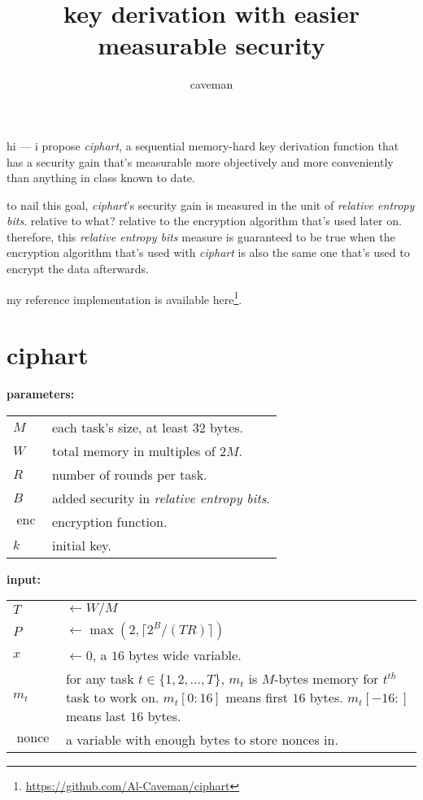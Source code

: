 \documentclass{article}
\author{caveman}
\title{key derivation with easier measurable security}
\DeclareMathOperator{\enc}{enc}
\DeclareMathOperator{\maxf}{max}
\DeclareMathOperator{\nonce}{nonce}
\begin{document}
\begin{multicols}{2}
\maketitle

hi --- i propose \emph{ciphart}, a sequential memory-hard key derivation
function that has a security gain that's measurable more objectively and
more conveniently than anything in class known to date.

to nail this goal, \emph{ciphart}'s security gain is measured in the unit
of \emph{relative entropy bits}.  relative to what?  relative to the
encryption algorithm that's used later on.  therefore, this \emph{relative
entropy bits} measure is guaranteed to be true when the encryption
algorithm that's used with \emph{ciphart} is also the same one that's used
to encrypt the data afterwards.

my reference implementation is available
here\footnote{\url{https://github.com/Al-Caveman/ciphart}}.

\tableofcontents
\vfill\null
\columnbreak

\section{ciphart}
\noindent\textbf{parameters:}

\begin{tabular}{lp{18em}}
    $M$ & each task's size, at least $32$ bytes.\\
    $W$ & total memory in multiples of $2M$.\\
    $R$ & number of rounds per task.\\
    $B$ & added security in \emph{relative entropy bits}.\\
    $\enc$ & encryption function.\\
    $k$ & initial key.\\
\end{tabular}

\noindent\textbf{input:}

\begin{tabular}{lp{18em}}
    $T$ & $\gets W/M$\\
    $P$ & $\gets \maxf(2, \lceil2^B / (TR)\rceil)$\\
    $x$ & $\gets 0$, a $16$ bytes wide variable.\\
    $m_t$ & for any task $t \in \{1,2,\ldots,T\}$, $m_t$ is $M$-bytes memory
    for $t^{th}$ task to work on.  $m_t[0:16]$ means first $16$ bytes.
    $m_t[-16:]$ means last $16$ bytes.\\
    $\nonce$ & a variable with enough bytes to store nonces in.\\
\end{tabular}


\end{multicols}
\end{document}
